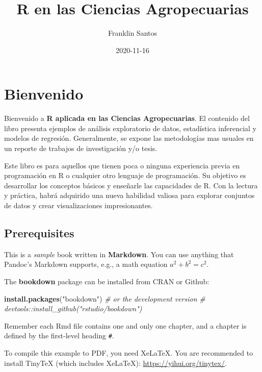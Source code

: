 \documentclass[
]{book}
\title{R en las Ciencias Agropecuarias}
\author{Franklin Santos}
\date{2020-11-16}
\newenvironment{Shaded}{\begin{snugshade}}{\end{snugshade}}
\newcommand{\CommentTok}[1]{\textcolor[rgb]{0.56,0.35,0.01}{\textit{#1}}}
\newcommand{\KeywordTok}[1]{\textcolor[rgb]{0.13,0.29,0.53}{\textbf{#1}}}
\newcommand{\NormalTok}[1]{#1}
\newcommand{\StringTok}[1]{\textcolor[rgb]{0.31,0.60,0.02}{#1}}
\begin{document}
\maketitle

{
\setcounter{tocdepth}{1}
\tableofcontents
}
\hypertarget{bienvenido}{%
\chapter*{Bienvenido}\label{bienvenido}}

Bienvenido a \textbf{R aplicada en las Ciencias Agropecuarias}. El contenido del libro presenta ejemplos de análisis exploratorio de datos, estadística inferencial y modelos de regresión. Generalmente, se expone las metodologías mas usuales en un reporte de trabajos de investigación y/o tesis.

Este libro es para aquellos que tienen poca o ninguna experiencia previa en programación en R o cualquier otro lenguaje de programación. Su objetivo es desarrollar los conceptos básicos y enseñarle las capacidades de R. Con la lectura y práctica, habrá adquirido una nueva habilidad valiosa para explorar conjuntos de datos y crear visualizaciones impresionantes.

\hypertarget{prerequisites}{%
\section{Prerequisites}\label{prerequisites}}

This is a \emph{sample} book written in \textbf{Markdown}. You can use anything that Pandoc's Markdown supports, e.g., a math equation \(a^2 + b^2 = c^2\).

The \textbf{bookdown} package can be installed from CRAN or Github:

\begin{Shaded}
\begin{Highlighting}[]
\KeywordTok{install.packages}\NormalTok{(}\StringTok{"bookdown"}\NormalTok{)}
\CommentTok{# or the development version}
\CommentTok{# devtools::install_github("rstudio/bookdown")}
\end{Highlighting}
\end{Shaded}

Remember each Rmd file contains one and only one chapter, and a chapter is defined by the first-level heading \texttt{\#}.

To compile this example to PDF, you need XeLaTeX. You are recommended to install TinyTeX (which includes XeLaTeX): \url{https://yihui.org/tinytex/}.
\end{document}
